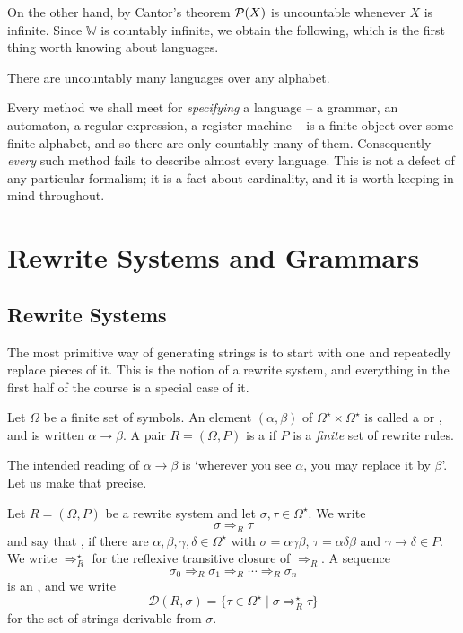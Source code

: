 \documentclass[a4paper]{scrartcl}
\newcommand{\WW}{\mathbb{W}}
\newcommand{\der}{\mathcal{D}}
\begin{document}
On the other hand, by Cantor's theorem $\mathcal{P}(X)$ is uncountable whenever $X$ is infinite. Since $\WW$ is countably infinite, we obtain the following, which is the first thing worth knowing about languages.

\begin{corollary}\label{cor:uncountablymanylanguages}
	There are uncountably many languages over any alphabet.
\end{corollary}

Every method we shall meet for \emph{specifying} a language -- a grammar, an automaton, a regular expression, a register machine -- is a finite object over some finite alphabet, and so there are only countably many of them. Consequently \emph{every} such method fails to describe almost every language. This is not a defect of any particular formalism; it is a fact about cardinality, and it is worth keeping in mind throughout.

\section{Rewrite Systems and Grammars}

\subsection{Rewrite Systems}

The most primitive way of generating strings is to start with one and repeatedly replace pieces of it. This is the notion of a rewrite system, and everything in the first half of the course is a special case of it.

\begin{definition}
	Let $\Omega$ be a finite set of symbols. An element $(\alpha, \beta)$ of $\Omega^\star \times \Omega^\star$ is called a  or , and is written $\alpha \to \beta$. A pair $R = (\Omega, P)$ is a  if $P$ is a \emph{finite} set of rewrite rules.
\end{definition}

The intended reading of $\alpha \to \beta$ is `wherever you see $\alpha$, you may replace it by $\beta$'. Let us make that precise.

\begin{definition}[Derivation]
	Let $R = (\Omega, P)$ be a rewrite system and let $\sigma, \tau \in \Omega^\star$. We write
	$$\sigma \Rightarrow_R \tau$$
	and say that , if there are $\alpha, \beta, \gamma, \delta \in \Omega^\star$ with $\sigma = \alpha\gamma\beta$, $\tau = \alpha\delta\beta$ and $\gamma \to \delta \in P$. We write $\Rightarrow_R^\star$ for the reflexive transitive closure of $\Rightarrow_R$. A sequence
	$$\sigma_0 \Rightarrow_R \sigma_1 \Rightarrow_R \cdots \Rightarrow_R \sigma_n$$
	is an , and we write
	$$\der(R, \sigma) = \{\tau \in \Omega^\star \mid \sigma \Rightarrow_R^\star \tau\}$$
	for the set of strings derivable from $\sigma$.
\end{definition}
\end{document}
